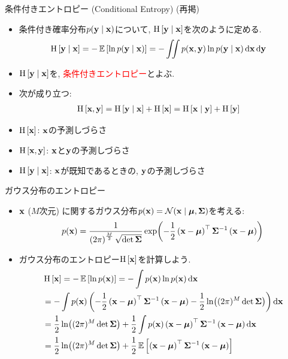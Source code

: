 \documentclass[dvipdfmx,notheorems,t]{beamer}
\begin{document}
\begin{frame}{条件付きエントロピー (Conditional Entropy) (再掲)}
\begin{itemize}
  \item 条件付き確率分布$p(\vb{y} \mid \vb{x})$について, $\operatorname{H} \left[ \vb{y} \mid \vb{x} \right]$を次のように定める.
  \begin{align*}
    \operatorname{H} \left[ \vb{y} \mid \vb{x} \right] &= -\operatorname{\mathbb{E}} \left[ \ln p(\vb{y} \mid \vb{x}) \right]
      = - \iint p(\vb{x}, \vb{y}) \ln p(\vb{y} \mid \vb{x}) \dd{\vb{x}} \dd{\vb{y}}
  \end{align*}
  \item $\operatorname{H} \left[ \vb{y} \mid \vb{x} \right]$を, \textcolor{red}{条件付きエントロピー}とよぶ.
  \item 次が成り立つ:
  \begin{align*}
    \operatorname{H} \left[ \vb{x}, \vb{y} \right] &= \operatorname{H} \left[ \vb{y} \mid \vb{x} \right] + \operatorname{H} \left[ \vb{x} \right]
      = \operatorname{H} \left[ \vb{x} \mid \vb{y} \right] + \operatorname{H} \left[ \vb{y} \right]
  \end{align*}
  \item $\operatorname{H} \left[ \vb{x} \right]$: $\vb{x}$の予測しづらさ
  \item $\operatorname{H} \left[ \vb{x}, \vb{y} \right]$: $\vb{x}$と$\vb{y}$の予測しづらさ
  \item $\operatorname{H} \left[ \vb{y} \mid \vb{x} \right]$: $\vb{x}$が既知であるときの, $\vb{y}$の予測しづらさ
\end{itemize}
\end{frame}

\begin{frame}{ガウス分布のエントロピー}
\begin{itemize}
  \item $\vb{x}$ ($M$次元) に関するガウス分布$p(\vb{x}) = \mathcal{N}(\vb{x} \mid \vb*{\mu}, \vb{\Sigma})$を考える:
  \begin{align*}
    p(\vb{x}) = \frac{1}{\left( 2\pi \right)^\frac{M}{2} \sqrt{\det \vb{\Sigma}}}
      \exp(-\frac{1}{2} \left( \vb{x} - \vb*{\mu} \right)^\top \vb{\Sigma}^{-1}
      \left( \vb{x} - \vb*{\mu} \right))
  \end{align*}
  \item ガウス分布のエントロピー$\operatorname{H} \left[ \vb{x} \right]$を計算しよう.
  \begin{align*}
    & \operatorname{H} \left[ \vb{x} \right] = -\operatorname{\mathbb{E}} \left[ \ln p(\vb{x}) \right]
    = -\int p(\vb{x}) \ln p(\vb{x}) \dd{\vb{x}} \\
    &= -\int p(\vb{x}) \left( -\frac{1}{2} \left( \vb{x} - \vb*{\mu} \right)^\top \vb{\Sigma}^{-1}
      \left( \vb{x} - \vb*{\mu} \right) - \frac{1}{2} \ln((2\pi)^M \det \vb{\Sigma}) \right) \dd{\vb{x}} \\
    &= \frac{1}{2} \ln((2\pi)^M \det \vb{\Sigma}) + \frac{1}{2} \int p(\vb{x})
      \left( \vb{x} - \vb*{\mu} \right)^\top \vb{\Sigma}^{-1}
      \left( \vb{x} - \vb*{\mu} \right) \dd{\vb{x}} \\
    &= \frac{1}{2} \ln((2\pi)^M \det \vb{\Sigma})
      + \frac{1}{2} \operatorname{\mathbb{E}} \left[ \left( \vb{x} - \vb*{\mu} \right)^\top \vb{\Sigma}^{-1}
      \left( \vb{x} - \vb*{\mu} \right) \right]
  \end{align*}
\end{itemize}
\end{frame}
\end{document}
